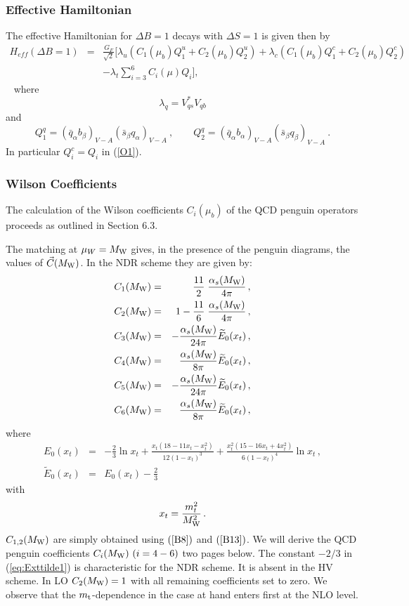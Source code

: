 \documentclass[12pt,rotate]{article}
\def\as{\alpha_s}
\newcommand{\mt}{m_{\rm t}}
\newcommand{\mw}{M_{\rm W}}
\newcommand{\be}{\begin{equation}}
\newcommand{\ee}{\end{equation}}
\begin{document}
\begin{itemize}
\begin{itemize}
\subsubsection{Effective Hamiltonian}
The effective Hamiltonian for $\Delta B=1$ decays with
$\Delta S=1$ is given then by
\begin{eqnarray}\label{HB4} 
H_{eff}(\Delta B=1) &=&
\frac{G_F}{\sqrt{2}} \Bigg[ \lambda_u(C_1(\mu_b) 
Q^u_1+C_2(\mu_b)Q^u_2) 
+\lambda_c( C_1(\mu_b) Q^c_1+C_2(\mu_b)Q^c_2)
\nonumber\\  
&& -\lambda_t \sum_{i=3}^6 C_i(\mu)Q_i \Bigg] ,
\end{eqnarray}~ 
where
\be\label{lb}
\lambda_q=V_{qs}^{*}V_{qb}
\ee
and
\be\label{Qq}
Q_1^q=(\bar q_\alpha b_\beta)_{V-A}(\bar s_\beta q_\alpha)_{V-A}~,
\quad\quad
Q_2^q=(\bar q_\alpha b_\alpha)_{V-A}(\bar s_\beta q_\beta)_{V-A}~.
\ee
In particular $Q_i^c=Q_i$ in (\ref{O1}).
\subsubsection{Wilson Coefficients}
The calculation of the Wilson coefficients $C_i(\mu_b)$ of
the QCD penguin operators proceeds as outlined in Section 6.3.

The matching at $\mu_W=\mw$ gives, in the presence of the penguin 
diagrams, the values of $\vec C(\mw)$. In the NDR scheme they 
are given by:
\begin{eqnarray}
C_1(\mw) &=&     \frac{11}{2} \; \frac{\as(\mw)}{4\pi} \, ,
\label{eq:CMw1QCD} \\
C_2(\mw) &=& 1 - \frac{11}{6} \; \frac{\as(\mw)}{4\pi} \, ,
\label{eq:CMw2QCD} \\
C_3(\mw) &=& -\frac{\as(\mw)}{24\pi} \widetilde{E}_0(x_t) \, ,
\label{eq:CMw3QCD} \\
C_4(\mw) &=& \frac{\as(\mw)}{8\pi} \widetilde{E}_0(x_t) \, ,
\label{eq:CMw4QCD} \\
C_5(\mw) &=& -\frac{\as(\mw)}{24\pi} \widetilde{E}_0(x_t) \, ,
\label{eq:CMw5QCD} \\
C_6(\mw) &=& \frac{\as(\mw)}{8\pi} \widetilde{E}_0(x_t) \, ,
\label{eq:CMw6QCD}
\end{eqnarray}
where
\begin{eqnarray}
E_0(x_t) &=& 
-\frac{2}{3} \ln x_t + \frac{x_t (18 -11 x_t - x_t^2)}{12 (1-x_t)^3} +
          \frac{x_t^2 (15 - 16 x_t  + 4 x_t^2)}{6 (1-x_t)^4} \ln x_t \, ,
\label{eq:Ext1} \\
\widetilde{E}_0(x_t) &=& E_0(x_t) - \frac{2}{3}
\label{eq:Exttilde1}
\end{eqnarray}
with
\begin{equation}
x_t = \frac{m_t^2}{\mw^2} \, .
\label{eq:xt}
\end{equation}
$C_{1,2}(\mw)$ are simply obtained using $(\ref{B8})$ and $(\ref{B13})$.
We will derive the QCD penguin coefficients $C_i(\mw)~(i=4-6)$
two pages below. The constant $-2/3$ in (\ref{eq:Exttilde1})
is characteristic for the NDR scheme. It is absent in the HV scheme.
In LO $C_2(\mw)=1$ with all remaining coefficients set to zero.
We observe that the $\mt$-dependence in the case at hand enters
first at the NLO level.


\end{itemize}
\end{itemize}
\end{document}
